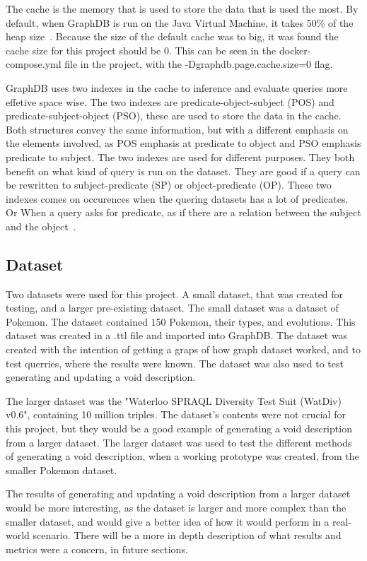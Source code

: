The cache is the memory that is used to store the data that is used the most. By default, when GraphDB is run on the Java Virtual Machine, it takes 50\% of the heap size~\cite{cache-strategy}.
Because the size of the default cache was to big, it was found the cache size for this project should be 0. This can be seen in the docker-compose.yml file in the project, with the -Dgraphdb.page.cache.size=0 flag.

GraphDB uses two indexes in the cache to inference and evaluate queries more effetive space wise. The two indexes are predicate-object-subject (POS) and predicate-subject-object (PSO), these are used to store the data in the cache. Both structures convey the same information, but with a different emphasis on the elements involved, as POS emphasis at predicate to object and PSO emphasis predicate to subject.
The two indexes are used for different purposes. They both benefit on what kind of query is run on the dataset. They are good if a query can be rewritten to subject-predicate (SP) or object-predicate (OP). These two indexes comes on occurences when the quering datasets has a lot of predicates. Or When a query asks for predicate, as if there are a relation between the subject and the object~\cite{graphdb-storage}.

\subsection{Dataset}\label{sec:dataset}
Two datasets were used for this project. A small dataset, that was created for testing, and a larger pre-existing dataset. The small dataset was a dataset of Pokemon. The dataset contained 150 Pokemon, their types, and evolutions. This dataset was created in a .ttl file and imported into GraphDB. The dataset was created with the intention of getting a graps of how graph dataset worked, and to test querries, where the results were known. The dataset was also used to test generating and updating a \gls{void} description.

The larger dataset was the "Waterloo SPRAQL Diversity Test Suit (WatDiv) v0.6", containing 10 million triples. The dataset's contents were not crucial for this project, but they would be a good example of generating a void description from a larger dataset. The larger dataset was used to test the different methods of generating a \gls{void} description, when a working prototype was created, from the smaller Pokemon dataset.

The results of generating and updating a \gls{void} description from a larger dataset would be more interesting, as the dataset is larger and more complex than the smaller dataset, and would give a better idea of how it would perform in a real-world scenario. There will be a more in depth description of what results and metrics were a concern, in future sections.

